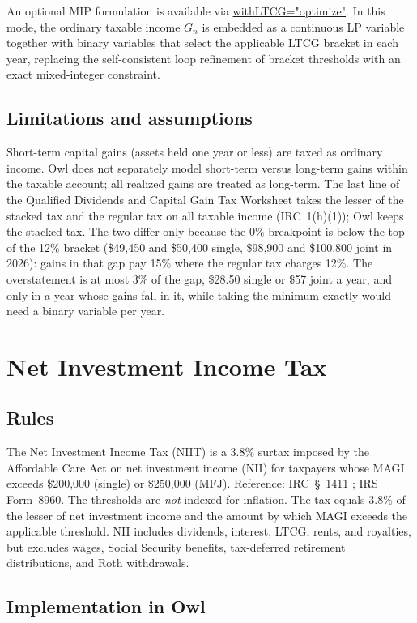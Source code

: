\documentclass[fleqn,12pt]{report}
\newcommand{\code}[1]{\url{#1}}
\begin{document}
An optional MIP formulation is available via \code{withLTCG="optimize"}.
In this mode, the ordinary taxable income $G_n$ is embedded as a continuous
LP variable together with binary variables that select the applicable LTCG
bracket in each year, replacing the self-consistent loop refinement of
bracket thresholds with an exact mixed-integer constraint.

\subsection*{Limitations and assumptions}

Short-term capital gains (assets held one year or less) are taxed as ordinary
income.
Owl does not separately model short-term versus long-term gains within the
taxable account; all realized gains are treated as long-term.
The last line of the Qualified Dividends and Capital Gain Tax Worksheet takes
the lesser of the stacked tax and the regular tax on all taxable income
(IRC~1(h)(1)); Owl keeps the stacked tax. The two differ only because the 0\%
breakpoint is below the top of the 12\% bracket (\$49,450 and \$50,400 single,
\$98,900 and \$100,800 joint in 2026): gains in that gap pay 15\% where the
regular tax charges 12\%. The overstatement is at most 3\% of the gap, \$28.50
single or \$57 joint a year, and only in a year whose gains fall in it, while
taking the minimum exactly would need a binary variable per year.

\section{Net Investment Income Tax}

\subsection*{Rules}

The Net Investment Income Tax (NIIT) is a 3.8\% surtax imposed by the
Affordable Care Act on net investment income (NII) for taxpayers whose MAGI
exceeds \$200,000 (single) or \$250,000 (MFJ).
Reference: IRC~§~1411 \cite{irc1411}; IRS Form~8960.
The thresholds are \emph{not} indexed for inflation.
The tax equals 3.8\% of the lesser of net investment income and the amount by
which MAGI exceeds the applicable threshold.
NII includes dividends, interest, LTCG, rents, and royalties, but excludes
wages, Social Security benefits, tax-deferred retirement distributions, and
Roth withdrawals.

\subsection*{Implementation in Owl}
\end{document}
